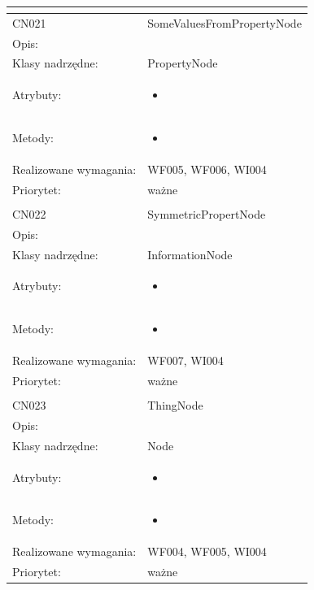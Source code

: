 \documentclass[a4paper,10pt]{article}
\begin{document}
\begin{center}
\begin{longtable}{|m{3cm}|m{9cm}|}
\multicolumn{2}{c}{} \\
 \hline

CN021 & SomeValuesFromPropertyNode \\ \hline
Opis: &     \\ \hline
Klasy nadrzędne: & PropertyNode     \\ \hline
Atrybuty: & \begin{itemize}
 \item 
\end{itemize}
 \\ \hline
Metody: & \begin{itemize}
 \item 
\end{itemize}
  \\ \hline
Realizowane wymagania: & WF005, WF006, WI004 \\ \hline
Priorytet: & ważne  \\ \hline

\multicolumn{2}{c}{} \\
 \hline

CN022 & SymmetricPropertNode \\ \hline
Opis: &     \\ \hline
Klasy nadrzędne: & InformationNode     \\ \hline
Atrybuty: & \begin{itemize}
 \item 
\end{itemize}
 \\ \hline
Metody: & \begin{itemize}
 \item 
\end{itemize}
  \\ \hline
Realizowane wymagania: & WF007, WI004 \\ \hline
Priorytet: & ważne  \\ \hline

\multicolumn{2}{c}{} \\
 \hline

CN023 & ThingNode \\ \hline
Opis: &     \\ \hline
Klasy nadrzędne: & Node     \\ \hline
Atrybuty: & \begin{itemize}
 \item 
\end{itemize}
 \\ \hline
Metody: & \begin{itemize}
 \item 
\end{itemize}
  \\ \hline
Realizowane wymagania: & WF004, WF005, WI004 \\ \hline
Priorytet: & ważne  \\ \hline


\end{longtable}
\end{center}
\end{document}
